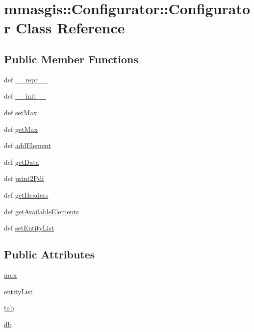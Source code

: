 \hypertarget{classmmasgis_1_1Configurator_1_1Configurator}{
\section{mmasgis::Configurator::Configurator Class Reference}
\label{classmmasgis_1_1Configurator_1_1Configurator}
}
\subsection*{Public Member Functions}
\begin{DoxyCompactItemize}
\item 
def \hyperlink{classmmasgis_1_1Configurator_1_1Configurator_abbd0021f723dd28cbc98bce04907a9c7}{\_\-\_\-repr\_\-\_\-}
\item 
def \hyperlink{classmmasgis_1_1Configurator_1_1Configurator_a4e2f2a1c5981a4d277b667bc92763ff0}{\_\-\_\-init\_\-\_\-}
\item 
def \hyperlink{classmmasgis_1_1Configurator_1_1Configurator_ab3984ea468895a7a797f75b9cafc4ee2}{setMax}
\item 
def \hyperlink{classmmasgis_1_1Configurator_1_1Configurator_a5c1fccf446d61c01ab67f5bfc9ba2482}{getMax}
\item 
def \hyperlink{classmmasgis_1_1Configurator_1_1Configurator_ad8b3625c8a10cc77a2b7a13cc27aaabf}{addElement}
\item 
def \hyperlink{classmmasgis_1_1Configurator_1_1Configurator_aa44e61bfc76f5f9fbeaf94a39f803b8f}{getData}
\item 
def \hyperlink{classmmasgis_1_1Configurator_1_1Configurator_a9d1f48a13808b0d7e6b46bf858bfe1fc}{print2Pdf}
\item 
def \hyperlink{classmmasgis_1_1Configurator_1_1Configurator_a368672c2a0645e09d375e124c9e50f5a}{getHeaders}
\item 
def \hyperlink{classmmasgis_1_1Configurator_1_1Configurator_a1c26e3e7f3b21549e6808c9561fcd681}{getAvailableElements}
\item 
def \hyperlink{classmmasgis_1_1Configurator_1_1Configurator_afab8441a7b863a799637ed5f99259b89}{setEntityList}
\end{DoxyCompactItemize}
\subsection*{Public Attributes}
\begin{DoxyCompactItemize}
\item 
\hyperlink{classmmasgis_1_1Configurator_1_1Configurator_a7f3c485048d08c5801a2f60fd53c96a0}{max}
\item 
\hyperlink{classmmasgis_1_1Configurator_1_1Configurator_ad1ae6d3e1ac7ca1400ade8523a1d38c2}{entityList}
\item 
\hyperlink{classmmasgis_1_1Configurator_1_1Configurator_a919d5d22e288a7284c2c8831386e6b39}{tab}
\item 
\hyperlink{classmmasgis_1_1Configurator_1_1Configurator_aafaf36e040cdfd167be7c865cc482200}{db}
\end{DoxyCompactItemize}


